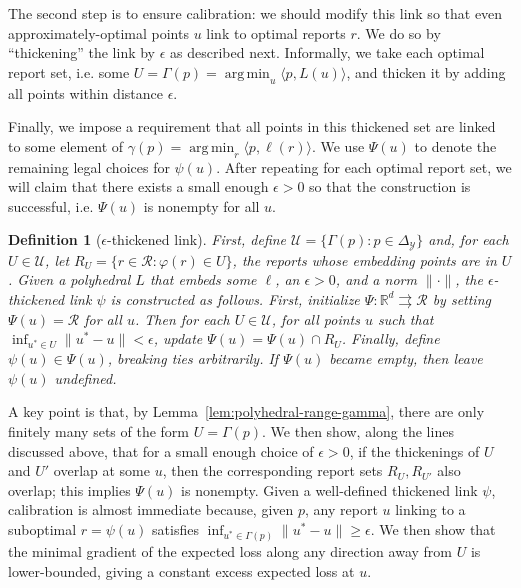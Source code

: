 \documentclass[11pt]{article}
\newcommand{\reals}{\mathbb{R}}
\newcommand{\simplex}{\Delta_\Y}
\newcommand{\R}{\mathcal{R}}
\newcommand{\U}{\mathcal{U}}
\newcommand{\Y}{\mathcal{Y}}
\newcommand{\inprod}[2]{\langle #1, #2 \rangle}%
\newcommand{\toto}{\rightrightarrows}
\DeclareMathOperator*{\argmin}{arg\,min}
\newtheorem{definition}{Definition}
\begin{document}
The second step is to ensure calibration: we should modify this link so that even approximately-optimal points $u$ link to optimal reports $r$.
We do so by ``thickening'' the link by $\epsilon$ as described next.
Informally, we take each optimal report set, i.e. some $U = \Gamma(p) = \argmin_u \inprod{p}{L(u)}$, and thicken it by adding all points within distance $\epsilon$.

Finally, we impose a requirement that all points in this thickened set are linked to some element of $\gamma(p) = \argmin_r \inprod{p}{\ell(r)}$.
We use $\Psi(u)$ to denote the remaining legal choices for $\psi(u)$.
After repeating for each optimal report set, we will claim that there exists a small enough $\epsilon > 0$ so that the construction is successful, i.e. $\Psi(u)$ is nonempty for all $u$.

\begin{definition}[$\epsilon$-thickened link] \label{def:eps-thick-link}
  First, define $\U = \{\Gamma(p) : p \in \simplex\}$ and, for each $U \in \U$, let $R_U = \{r \in \R : \varphi(r) \in U\}$, the reports whose embedding points are in $U$.
  Given a polyhedral $L$ that embeds some $\ell$, an $\epsilon > 0$, and a norm $\|\cdot\|$, the \emph{$\epsilon$-thickened link} $\psi$ is constructed as follows.
  First, initialize $\Psi: \reals^d \toto \R$ by setting $\Psi(u) = \R$ for all $u$.
  Then for each $U \in \U$, for all points $u$ such that $\inf_{u^* \in U} \|u^*-u\| < \epsilon$, update $\Psi(u) = \Psi(u) \cap R_U$.
  Finally, define $\psi(u) \in \Psi(u)$, breaking ties arbitrarily.
  If $\Psi(u)$ became empty, then leave $\psi(u)$ undefined.
\end{definition}
A key point is that, by Lemma~\ref{lem:polyhedral-range-gamma}, there are only finitely many sets of the form $U = \Gamma(p)$.
We then show, along the lines discussed above, that for a small enough choice of $\epsilon > 0$, if the thickenings of $U$ and $U'$ overlap at some $u$, then the corresponding report sets $R_U, R_{U'}$ also overlap; this implies $\Psi(u)$ is nonempty.
Given a well-defined thickened link $\psi$, calibration is almost immediate because, given $p$, any report $u$ linking to a suboptimal $r = \psi(u)$ satisfies $\inf_{u^* \in \Gamma(p)} \|u^* - u\| \geq \epsilon$.
  We then show that the minimal gradient of the expected loss along any direction away from $U$ is lower-bounded, giving a constant excess expected loss at $u$.
\end{document}
